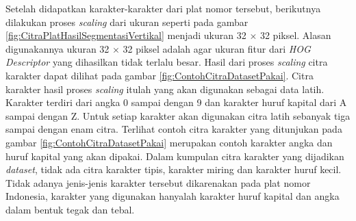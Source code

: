 \begin{adjustbox}{width=1\textwidth}
	\noindent
	\begin{minipage}{\linewidth}
		\label{fig:CitraPlatHasilSegmentasiHorizontal}
	\end{minipage}
\end{adjustbox}
\begin{adjustbox}{width=1\textwidth}
	\noindent\begin{minipage}{\linewidth}
		\label{fig:CitraPlatHasilSegmentasiVertikal}
	\end{minipage}
\end{adjustbox}
\noindent Setelah didapatkan karakter-karakter dari plat nomor tersebut, berikutnya dilakukan proses \textit{scaling} dari ukuran seperti pada gambar \ref{fig:CitraPlatHasilSegmentasiVertikal} menjadi ukuran 32 $\times$ 32 piksel. Alasan digunakannya ukuran 32 $\times$ 32 piksel adalah agar ukuran fitur dari \textit{HOG Descriptor} yang dihasilkan tidak terlalu besar. Hasil dari proses \textit{scaling} citra karakter dapat dilihat pada gambar \ref{fig:ContohCitraDatasetPakai}. Citra karakter hasil proses \textit{scaling} itulah yang akan digunakan sebagai data latih.
\noindent Karakter terdiri dari angka 0 sampai dengan 9 dan karakter huruf kapital dari A sampai dengan Z. Untuk setiap karakter akan digunakan citra latih sebanyak tiga sampai dengan enam citra. Terlihat contoh citra karakter yang ditunjukan pada gambar \ref{fig:ContohCitraDatasetPakai} merupakan contoh karakter angka dan huruf kapital yang akan dipakai. Dalam kumpulan citra karakter yang dijadikan \textit{dataset}, tidak ada citra karakter tipis, karakter miring dan karakter huruf kecil. Tidak adanya jenis-jenis karakter tersebut dikarenakan pada plat nomor Indonesia, karakter yang digunakan hanyalah karakter huruf kapital dan angka dalam bentuk tegak dan tebal.
